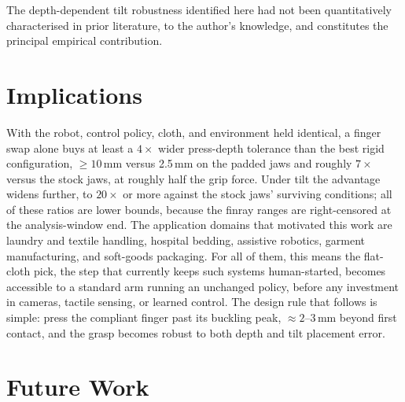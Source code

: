 The depth-dependent tilt robustness identified here had not been
quantitatively characterised in prior literature, to the author's
knowledge, and constitutes the principal empirical contribution.

\section{Implications}

With the robot, control policy, cloth, and environment held identical,
a finger swap alone buys at least a $4\times$ wider press-depth
tolerance than the best rigid configuration, $\geq 10$\,mm versus
2.5\,mm on the padded jaws and roughly $7\times$ versus the stock jaws,
at roughly half the grip force.
Under tilt the advantage widens further, to $20\times$ or more against the
stock jaws' surviving conditions; all of these ratios are lower bounds,
because the finray ranges are right-censored at the analysis-window end.
The application domains that motivated this work are laundry and
textile handling, hospital bedding, assistive robotics, garment
manufacturing, and soft-goods packaging. For all of them, this means
the flat-cloth pick, the step that currently keeps such systems
human-started, becomes accessible to a standard arm running an
unchanged policy, before any investment in cameras, tactile sensing, or
learned control. The design rule that follows is simple: press the
compliant finger past its buckling peak, $\approx 2$--$3$\,mm beyond
first contact, and the grasp becomes robust to both depth and tilt
placement error.

\section{Future Work}

